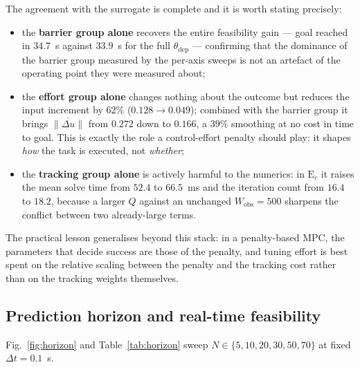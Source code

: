 \documentclass[11pt,a4paper]{article}
\newcommand{\Wobs}{W_{\mathrm{obs}}}
\newcommand{\thst}{\theta_{\mathrm{dep}}}
\begin{document}
The agreement with the surrogate is complete and it is worth stating precisely:
\begin{itemize}
  \item the \textbf{barrier group alone} recovers the entire feasibility gain --- goal reached in $34.7$~s
        against $33.9$~s for the full $\thst$ --- confirming that the dominance of the barrier group measured by the
        per-axis sweeps is not an artefact of the operating point they were measured about;
  \item the \textbf{effort group alone} changes nothing about the outcome but reduces the input increment by
        $62\%$ ($0.128\to0.049$); combined with the barrier group it brings
        $\overline{\|\Delta u\|}$ from $0.272$ down to $0.166$, a $39\%$ smoothing at no cost in time to
        goal. This is exactly the role a control-effort penalty should play: it shapes \emph{how} the task is
        executed, not \emph{whether};
  \item the \textbf{tracking group alone} is actively harmful to the numerics: in $\mathrm{E}_c$ it raises
        the mean solve time from $52.4$ to $66.5$~ms and the iteration count from $16.4$ to $18.2$, because a
        larger $Q$ against an unchanged $\Wobs=500$ sharpens the conflict between two already-large terms.
\end{itemize}
The practical lesson generalises beyond this stack: in a penalty-based MPC, the parameters that decide
success are those of the penalty, and tuning effort is best spent on the relative scaling between the penalty
and the tracking cost rather than on the tracking weights themselves.

\subsection{Prediction horizon and real-time feasibility}
\label{sec:horizon}

Fig.~\ref{fig:horizon} and Table~\ref{tab:horizon} sweep $N\in\{5,10,20,30,50,70\}$ at fixed
$\Delta t=0.1$~s.
\end{document}
